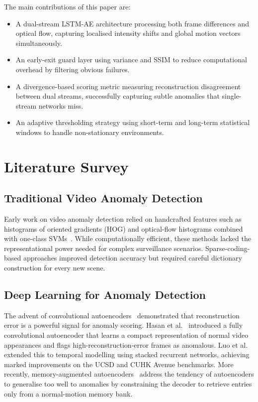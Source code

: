 \documentclass[runningheads]{llncs}
\begin{document}
The main contributions of this paper are:
\begin{itemize}
    \item A dual-stream LSTM-AE architecture processing both frame
          differences and optical flow, capturing localised intensity
          shifts and global motion vectors simultaneously.
    \item An early-exit guard layer using variance and SSIM to reduce
          computational overhead by filtering obvious failures.
    \item A divergence-based scoring metric measuring reconstruction
          disagreement between dual streams, successfully capturing subtle
          anomalies that single-stream networks miss.
    \item An adaptive thresholding strategy using short-term and
          long-term statistical windows to handle non-stationary
          environments.
\end{itemize}

\section{Literature Survey}

\subsection{Traditional Video Anomaly Detection}
Early work on video anomaly detection relied on handcrafted features such
as histograms of oriented gradients (HOG) and optical-flow histograms
combined with one-class SVMs~\cite{ref_hog}. While computationally
efficient, these methods lacked the representational power needed for
complex surveillance scenarios. Sparse-coding-based approaches
\cite{ref_sparse} improved detection accuracy but required careful
dictionary construction for every new scene.

\subsection{Deep Learning for Anomaly Detection}
The advent of convolutional autoencoders~\cite{ref_conv_ae} demonstrated
that reconstruction error is a powerful signal for anomaly scoring. Hasan
et al.~\cite{ref_hasan2016} introduced a fully convolutional autoencoder
that learns a compact representation of normal video appearances and flags
high-reconstruction-error frames as anomalous. Luo et al.~\cite{ref_luo2017}
extended this to temporal modelling using stacked recurrent networks,
achieving marked improvements on the UCSD and CUHK Avenue benchmarks.
More recently, memory-augmented autoencoders~\cite{ref_memae} address the
tendency of autoencoders to generalise too well to anomalies by
constraining the decoder to retrieve entries only from a normal-motion
memory bank.
\end{document}
